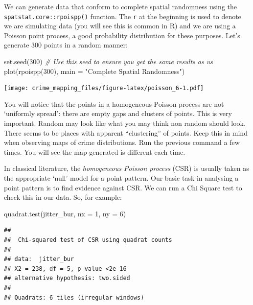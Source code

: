 \documentclass[
  krantz2]{krantz}
\makeatletter
\newenvironment{Shaded}{\begin{snugshade}}{\end{snugshade}}
\newcommand{\AttributeTok}[1]{\textcolor[rgb]{0.61,0.61,0.61}{#1}}
\newcommand{\CommentTok}[1]{\textcolor[rgb]{0.37,0.37,0.37}{\textit{#1}}}
\newcommand{\DecValTok}[1]{\textcolor[rgb]{0.06,0.06,0.06}{#1}}
\newcommand{\FunctionTok}[1]{\textcolor[rgb]{0,0,0}{#1}}
\newcommand{\NormalTok}[1]{#1}
\newcommand{\StringTok}[1]{\textcolor[rgb]{0.5,0.5,0.5}{#1}}
\newenvironment{kframe}{%
\medskip{}
\setlength{\fboxsep}{.8em}
 \def\at@end@of@kframe{}%
 \ifinner\ifhmode%
  \def\at@end@of@kframe{\end{minipage}}%
  \begin{minipage}{\columnwidth}%
 \fi\fi%
 \def\FrameCommand##1{\hskip\@totalleftmargin \hskip-\fboxsep
 \colorbox{shadecolor}{##1}\hskip-\fboxsep
     \hskip-\linewidth \hskip-\@totalleftmargin \hskip\columnwidth}%
 \MakeFramed {\advance\hsize-\width
   \@totalleftmargin\z@ \linewidth\hsize
   \@setminipage}}%
 {\par\unskip\endMakeFramed%
 \at@end@of@kframe}
\renewenvironment{Shaded}{\begin{kframe}}{\end{kframe}}
\makeatother
\begin{document}
We can generate data that conform to complete spatial randomness using the \texttt{spatstat.core::rpoispp()} function. The \texttt{r} at the beginning is used to denote we are simulating data (you will see this is common in R) and we are using a Poisson point process, a good probability distribution for these purposes. Let's generate 300 points in a random manner:

\begin{Shaded}
\begin{Highlighting}[]
\FunctionTok{set.seed}\NormalTok{(}\DecValTok{300}\NormalTok{) }\CommentTok{\# Use this seed to ensure you get the same results as us}
\FunctionTok{plot}\NormalTok{(}\FunctionTok{rpoispp}\NormalTok{(}\DecValTok{300}\NormalTok{), }\AttributeTok{main =} \StringTok{"Complete Spatial Randomness"}\NormalTok{)}
\end{Highlighting}
\end{Shaded}

\texttt{[image: crime\_mapping\_files/figure-latex/poisson\_6-1.pdf]}

You will notice that the points in a homogeneous Poisson process are not `uniformly spread': there are empty gaps and clusters of points. This is very important. Random may look like what you may think non random should look. There seems to be places with apparent ``clustering'' of points. Keep this in mind when observing maps of crime distributions. Run the previous command a few times. You will see the map generated is different each time.

In classical literature, the \emph{homogeneous Poisson process} (CSR) is usually taken as the appropriate `null' model for a point pattern. Our basic task in analysing a point pattern is to find evidence against CSR. We can run a Chi Square test to check this in our data. So, for example:

\begin{Shaded}
\begin{Highlighting}[]
\FunctionTok{quadrat.test}\NormalTok{(jitter\_bur, }\AttributeTok{nx =} \DecValTok{1}\NormalTok{, }\AttributeTok{ny =} \DecValTok{6}\NormalTok{)}
\end{Highlighting}
\end{Shaded}

\begin{verbatim}
## 
##  Chi-squared test of CSR using quadrat counts
## 
## data:  jitter_bur
## X2 = 238, df = 5, p-value <2e-16
## alternative hypothesis: two.sided
## 
## Quadrats: 6 tiles (irregular windows)
\end{verbatim}
\end{document}
